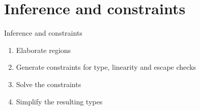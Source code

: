 \documentclass[aspectratio=169,dvipsnames,svgnames,10pt]{beamer}
\begin{document}
\section{Inference and constraints}

\begin{frame}{Inference and constraints}

  \begin{enumerate}
  \item Elaborate regions
  \item Generate constraints for type, linearity and escape checks
  \item Solve the constraints
  \item Simplify the resulting types
  \end{enumerate}
\end{frame}



\end{document}
